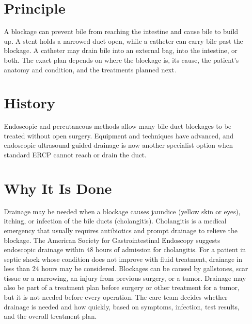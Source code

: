 \section*{Principle}
A blockage can prevent bile from reaching the intestine and cause bile to build up. A stent holds a narrowed duct open, while a catheter can carry bile past the blockage. A catheter may drain bile into an external bag, into the intestine, or both. The exact plan depends on where the blockage is, its cause, the patient's anatomy and condition, and the treatments planned next.

\section*{History}
Endoscopic and percutaneous methods allow many bile-duct blockages to be treated without open surgery. Equipment and techniques have advanced, and endoscopic ultrasound-guided drainage is now another specialist option when standard ERCP cannot reach or drain the duct.

\section*{Why It Is Done}
Drainage may be needed when a blockage causes jaundice (yellow skin or eyes), itching, or infection of the bile ducts (cholangitis). Cholangitis is a medical emergency that usually requires antibiotics and prompt drainage to relieve the blockage. The American Society for Gastrointestinal Endoscopy suggests endoscopic drainage within 48 hours of admission for cholangitis. For a patient in septic shock whose condition does not improve with fluid treatment, drainage in less than 24 hours may be considered. Blockages can be caused by gallstones, scar tissue or a narrowing, an injury from previous surgery, or a tumor. Drainage may also be part of a treatment plan before surgery or other treatment for a tumor, but it is not needed before every operation. The care team decides whether drainage is needed and how quickly, based on symptoms, infection, test results, and the overall treatment plan.

